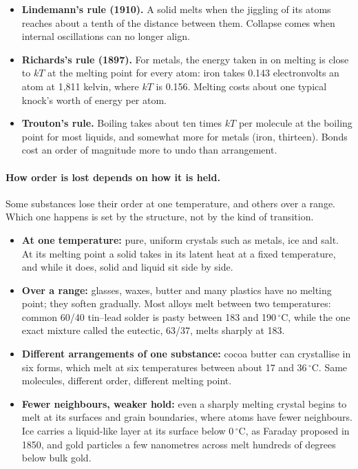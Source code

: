 \documentclass[11pt,a4paper]{article}
\begin{document}
\begin{itemize}
\item \textbf{Lindemann's rule (1910).} A solid melts when the jiggling of its atoms reaches about a tenth of the distance between them. Collapse comes when internal oscillations can no longer align.
\item \textbf{Richards's rule (1897).} For metals, the energy taken in on melting is close to $kT$ at the melting point for every atom: iron takes 0.143 electronvolts an atom at 1,811 kelvin, where $kT$ is 0.156. Melting costs about one typical knock's worth of energy per atom. 
\item \textbf{Trouton's rule.} Boiling takes about ten times $kT$ per molecule at the boiling point for most liquids, and somewhat more for metals (iron, thirteen). Bonds cost an order of magnitude more to undo than arrangement.
\end{itemize}

\paragraph{How order is lost depends on how it is held.} Some substances lose their order at one temperature, and others over a range. Which one happens is set by the structure, not by the kind of transition.
\begin{itemize}
\item \textbf{At one temperature:} pure, uniform crystals such as metals, ice and salt. At its melting point a solid takes in its latent heat at a fixed temperature, and while it does, solid and liquid sit side by side.
\item \textbf{Over a range:} glasses, waxes, butter and many plastics have no melting point; they soften gradually. Most alloys melt between two temperatures: common 60/40 tin--lead solder is pasty between 183 and 190\,$^\circ$C, while the one exact mixture called the eutectic, 63/37, melts sharply at 183.
\item \textbf{Different arrangements of one substance:} cocoa butter can crystallise in six forms, which melt at six temperatures between about 17 and 36\,$^\circ$C. Same molecules, different order, different melting point.
\item \textbf{Fewer neighbours, weaker hold:} even a sharply melting crystal begins to melt at its surfaces and grain boundaries, where atoms have fewer neighbours. Ice carries a liquid-like layer at its surface below 0\,$^\circ$C, as Faraday proposed in 1850, and gold particles a few nanometres across melt hundreds of degrees below bulk gold.
\end{itemize}
\end{document}
